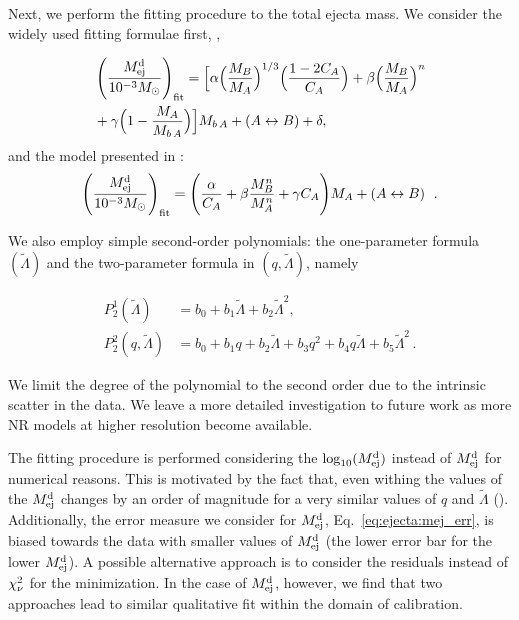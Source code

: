 Next, we perform the fitting procedure to the total ejecta mass. 
We consider the widely used fitting formulae first, 
\citep{Kawaguchi:2016ana,Dietrich:2016fpt,Radice:2018pdn}, 

\begin{eqnarray}
\label{eq:fit_Mej}
&\left(\frac{M^{\text{d}}_{\text{ej}}}{10^{-3}M_{\odot}}\right)_{\rm fit} =
\Big[\alpha\Big(\frac{M_B}{M_A}\Big)^{1/3}\Big(\frac{1-2C_A}{C_A}\Big)+  
\beta\Big(\frac{M_B}{M_A}\Big)^n \\
&+ \gamma\Big(1-\frac{M_A}{M_{b\,A}} \Big)\Big]M_{b\,A} + (A\leftrightarrow B) + \delta\nonumber,
\end{eqnarray}
and the model presented in \cite{Kruger:2020gig}:
\begin{equation}
\label{eq:fit_Mej_Kruger}
\left(\frac{M^{\text{d}}_{\text{ej}}}{10^{-3}M_{\odot}}\right)_{\rm fit} =
\left(\frac{\alpha}{C_A} + \beta\frac{M_B ^n}{M_A ^n} + \gamma
C_A\Bigg)M_A + (A\leftrightarrow B)\right. \ .
\end{equation}

We also employ simple second-order polynomials: 
the one-parameter formula $(\tilde\Lambda)$ and the two-parameter
formula in $(q,\tilde\Lambda)$, namely

\begin{align}\label{eq:polyfit2}
P_2 ^1(\tilde{\Lambda}) &= b_0 + b_1\tilde\Lambda + b_2 \tilde\Lambda^2, \\\label{eq:polyfit22}
P_2 ^2(q,\tilde\Lambda) &= b_0 + b_1q + b_2\tilde\Lambda + b_3q ^2 +  b_4 q \tilde\Lambda + b_5\tilde\Lambda^2 \, .
\end{align}

We limit the degree of the polynomial to the second order due to the intrinsic scatter 
in the data. We leave a more detailed investigation to future work as more \ac{NR} models at 
higher resolution become available.

The fitting procedure is performed considering the $\log_{10}(M^{\text{d}}_{\text{ej}})$ instead of $M^{\text{d}}_{\text{ej}}$
for numerical reasons. This is motivated by the fact that, even withing \DSrefset{} the values 
of the $M^{\text{d}}_{\text{ej}}$ changes by an order of magnitude for a very similar values of $q$ and $\tilde{\Lambda}$
().
Additionally, the error measure we consider for $M^{\text{d}}_{\text{ej}}$, Eq.~\eqref{eq:ejecta:mej_err}, is 
biased towards the data with smaller values of $M^{\text{d}}_{\text{ej}}$ (the lower error bar for the lower $M^{\text{d}}_{\text{ej}}$).
A possible alternative approach is to consider the residuals instead of $\chi_{\nu}^2$ for the 
minimization. In the case of $M^{\text{d}}_{\text{ej}}$, however, we find that two approaches lead to similar 
qualitative fit within the domain of calibration.

